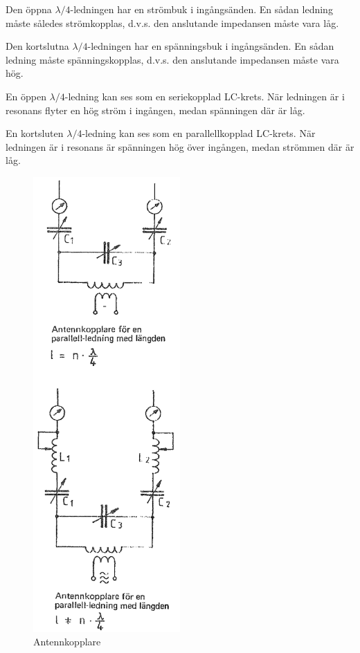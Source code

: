 Den öppna \(\lambda/4\)-ledningen har en strömbuk i ingångsänden. En
sådan ledning måste således strömkopplas, d.v.s. den anslutande
impedansen måste vara låg.

Den kortslutna \(\lambda/4\)-ledningen har en spänningsbuk i
ingångsänden. En sådan ledning måste spänningskopplas, d.v.s. den
anslutande impedansen måste vara hög.

En öppen \(\lambda/4\)-ledning kan ses som en seriekopplad
LC-krets. När ledningen är i resonans flyter en hög ström i ingången,
medan spänningen där är låg.

En kortsluten \(\lambda/4\)-ledning kan ses som en parallellkopplad
LC-krets. När ledningen är i resonans är spänningen hög över ingången,
medan strömmen där är låg.

\clearpage %
%
\begin{figure}
  \includegraphics[width=0.5\textwidth]{images/cropped_pdfs/bild_2_6-36.pdf}
  \caption{Antennkopplare}
  \label{fig:bildII6-36}
\end{figure}
%
